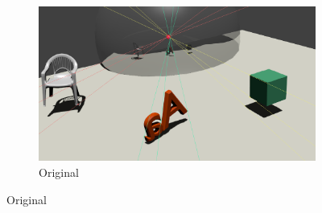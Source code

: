 \documentclass{thesis}
\begin{document}
\begin{figure}
	\centering
	\begin{subfigure}[b]{0.5\textwidth}
                \includegraphics[width=\textwidth]{1b-genuine}
                \caption{Original}
    \end{subfigure}
    

\end{figure}
\end{document}
